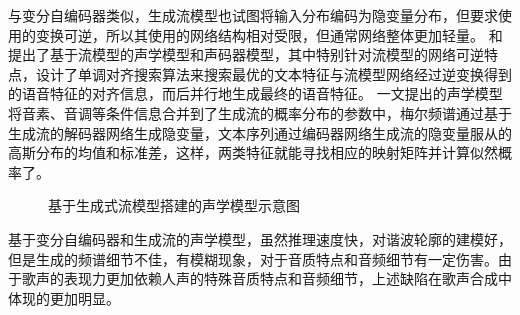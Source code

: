与变分自编码器类似，生成流模型也试图将输入分布编码为隐变量分布，但要求使用的变换可逆，所以其使用的网络结构相对受限，但通常网络整体更加轻量。
\citet{waveglow}和\citet{kim2020glow}提出了基于流模型的声学模型和声码器模型，其中\citet{kim2020glow}特别针对流模型的网络可逆特点，设计了单调对齐搜索算法来搜索最优的文本特征与流模型网络经过逆变换得到的语音特征的对齐信息，而后并行地生成最终的语音特征。
\citet{kim2020glow}一文提出的声学模型将音素、音调等条件信息合并到了生成流的概率分布的参数中，梅尔频谱通过基于生成流的解码器网络生成隐变量，文本序列通过编码器网络生成流的隐变量服从的高斯分布的均值和标准差，这样，两类特征就能寻找相应的映射矩阵并计算似然概率了。
\begin{figure}[htbp]
  \caption{基于生成式流模型搭建的声学模型示意图}
\end{figure}
基于变分自编码器和生成流的声学模型，虽然推理速度快，对谐波轮廓的建模好，但是生成的频谱细节不佳，有模糊现象，对于音质特点和音频细节有一定伤害。由于歌声的表现力更加依赖人声的特殊音质特点和音频细节，上述缺陷在歌声合成中体现的更加明显。
